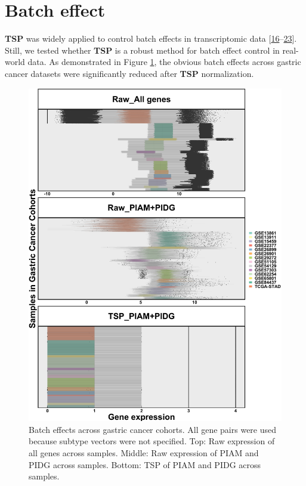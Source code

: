 \documentclass[
  12pt,
]{book}
\begin{document}
\hypertarget{batch-effect}{%
\section{Batch effect}\label{batch-effect}}

\textbf{TSP} was widely applied to control batch effects in transcriptomic data {[}\protect\hyperlink{ref-RN369}{16}--\protect\hyperlink{ref-RN365}{23}{]}. Still, we tested whether \textbf{TSP} is a robust method for batch effect control in real-world data. As demonstrated in Figure \ref{fig:be01}, the obvious batch effects across gastric cancer datasets were significantly reduced after \textbf{TSP} normalization.

\begin{figure}

{\centering \includegraphics[width=0.9\linewidth]{./fig/bactch-effect-01} 

}

\caption{Batch effects across gastric cancer cohorts. All gene pairs were used because subtype vectors were not specified. Top: Raw expression of all genes across samples. Middle: Raw expression of PIAM and PIDG across samples. Bottom: TSP of PIAM and PIDG across samples.}\label{fig:be01}
\end{figure}
\end{document}
